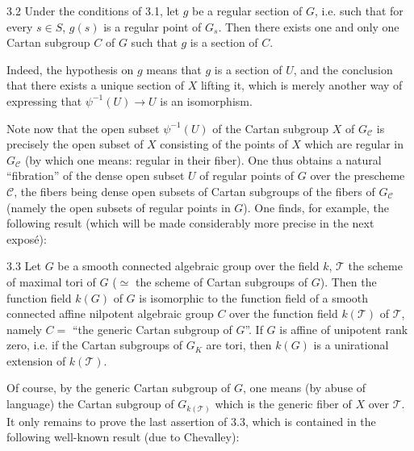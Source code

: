 \begin{corollary}{3.2}\label{XIII.3.2}
Under the conditions of 3.1, let $g$ be a regular section of $G$, i.e.
such that for every $s\in S$, $g(s)$ is a regular point of $G_s$. Then
there exists one and only one Cartan subgroup $C$ of $G$ such that $g$
is a section of $C$.
\end{corollary}
Indeed, the hypothesis on $g$ means that $g$ is a section of $U$, and
the conclusion that there exists a unique section of $X$ lifting it,
which is merely another way of expressing that $\psi^{-1}(U)\to U$
is an isomorphism.

Note now that the open subset $\psi^{-1}(U)$ of the Cartan subgroup
$X$ of $G_{\mathcal C}$ is precisely the open subset of $X$ consisting
of the points of $X$ which are regular in $G_{\mathcal C}$ (by which
one means: regular in their fiber). One thus obtains a natural
``fibration'' of the dense open subset $U$ of regular points of $G$
over the prescheme $\mathcal C$, the fibers being dense open subsets
of Cartan subgroups of the fibers of $G_{\mathcal C}$ (namely the
open subsets of regular points in $G$). One finds, for example, the
following result (which will be made considerably more precise in
the next expos\'e):

\begin{corollary}{3.3}\label{XIII.3.3}
Let $G$ be a smooth connected algebraic group over the field $k$,
$\mathcal T$ the scheme of maximal tori of $G$ ($\simeq$ the scheme
of Cartan subgroups of $G$). Then the function field $k(G)$ of $G$
is isomorphic to the function field of a smooth connected affine
nilpotent algebraic group $C$ over the function field $k(\mathcal T)$
of $\mathcal T$, namely $C=$ ``the generic Cartan subgroup of $G$''.
If $G$ is affine of unipotent rank zero, i.e. if the Cartan subgroups
of $G_K$ are tori, then $k(G)$ is a unirational extension of
$k(\mathcal T)$.
\end{corollary}
Of course, by the generic Cartan subgroup of $G$, one means (by abuse
of language) the Cartan subgroup of $G_{k(\mathcal T)}$ which is the
generic fiber of $X$ over $\mathcal T$. It only remains to prove the
last assertion of 3.3, which is contained in the following well-known
result (due to Chevalley):

